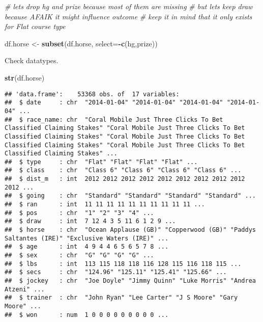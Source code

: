 \documentclass[
]{article}
\newenvironment{Shaded}{\begin{snugshade}}{\end{snugshade}}
\newcommand{\AttributeTok}[1]{\textcolor[rgb]{0.13,0.29,0.53}{#1}}
\newcommand{\CommentTok}[1]{\textcolor[rgb]{0.56,0.35,0.01}{\textit{#1}}}
\newcommand{\FunctionTok}[1]{\textcolor[rgb]{0.13,0.29,0.53}{\textbf{#1}}}
\newcommand{\NormalTok}[1]{#1}
\newcommand{\OtherTok}[1]{\textcolor[rgb]{0.56,0.35,0.01}{#1}}
\newcommand{\SpecialCharTok}[1]{\textcolor[rgb]{0.81,0.36,0.00}{\textbf{#1}}}
\begin{document}
\begin{Shaded}
\begin{Highlighting}[]
\CommentTok{\# let\textquotesingle{}s drop hg and prize because most of them are missing}
\CommentTok{\# but let\textquotesingle{}s keep draw because AFAIK it might influence outcome}
\CommentTok{\# keep it in mind that it only exists for Flat course type}

\NormalTok{df.horse }\OtherTok{\textless{}{-}} \FunctionTok{subset}\NormalTok{(df.horse, }\AttributeTok{select=}\SpecialCharTok{{-}}\FunctionTok{c}\NormalTok{(hg,prize))}
\end{Highlighting}
\end{Shaded}

Check datatypes.

\begin{Shaded}
\begin{Highlighting}[]
\FunctionTok{str}\NormalTok{(df.horse)}
\end{Highlighting}
\end{Shaded}

\begin{verbatim}
## 'data.frame':    53368 obs. of  17 variables:
##  $ date     : chr  "2014-01-04" "2014-01-04" "2014-01-04" "2014-01-04" ...
##  $ race_name: chr  "Coral Mobile Just Three Clicks To Bet Classified Claiming Stakes" "Coral Mobile Just Three Clicks To Bet Classified Claiming Stakes" "Coral Mobile Just Three Clicks To Bet Classified Claiming Stakes" "Coral Mobile Just Three Clicks To Bet Classified Claiming Stakes" ...
##  $ type     : chr  "Flat" "Flat" "Flat" "Flat" ...
##  $ class    : chr  "Class 6" "Class 6" "Class 6" "Class 6" ...
##  $ dist_m   : int  2012 2012 2012 2012 2012 2012 2012 2012 2012 2012 ...
##  $ going    : chr  "Standard" "Standard" "Standard" "Standard" ...
##  $ ran      : int  11 11 11 11 11 11 11 11 11 11 ...
##  $ pos      : chr  "1" "2" "3" "4" ...
##  $ draw     : int  7 12 4 3 5 11 6 1 2 9 ...
##  $ horse    : chr  "Ocean Applause (GB)" "Copperwood (GB)" "Paddys Saltantes (IRE)" "Exclusive Waters (IRE)" ...
##  $ age      : int  4 9 4 4 6 5 6 5 7 8 ...
##  $ sex      : chr  "G" "G" "G" "G" ...
##  $ lbs      : int  113 115 118 118 116 128 115 116 118 115 ...
##  $ secs     : chr  "124.96" "125.11" "125.41" "125.66" ...
##  $ jockey   : chr  "Joe Doyle" "Jimmy Quinn" "Luke Morris" "Andrea Atzeni" ...
##  $ trainer  : chr  "John Ryan" "Lee Carter" "J S Moore" "Gary Moore" ...
##  $ won      : num  1 0 0 0 0 0 0 0 0 0 ...
\end{verbatim}
\end{document}
